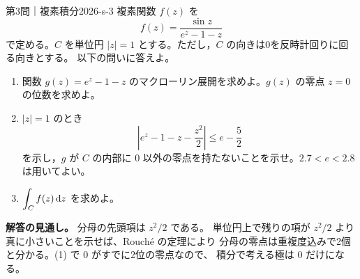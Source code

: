 \begin{problem}{第3問｜複素積分}{2026-s-3}
複素関数 $f(z)$ を
\[
f(z)=\frac{\sin z}{e^z-1-z}
\]
で定める。$C$ を単位円 $|z|=1$ とする。ただし，$C$ の向きは0を反時計回りに回る向きとする。
以下の問いに答えよ。
\begin{enumerate}
  \item[(1)] 関数 $g(z)=e^z-1-z$ のマクローリン展開を求めよ。$g(z)$ の零点 $z=0$ の位数を求めよ。
  \item[(2)] $|z|=1$ のとき
  \[
  \left|e^z-1-z-\frac{z^2}{2}\right|\le e-\frac52
  \]
  を示し，$g$ が $C$ の内部に $0$ 以外の零点を持たないことを示せ。$2.7<e<2.8$ は用いてよい。
  \item[(3)] $\displaystyle\int_C f(z)\,\mathrm{d} z$ を求めよ。
\end{enumerate}
\end{problem}
\begin{memo*}
\textbf{解答の見通し。}
分母の先頭項は $z^2/2$ である。
単位円上で残りの項が $z^2/2$ より真に小さいことを示せば、Rouch\'e の定理により
分母の零点は重複度込みで2個と分かる。(1) で $0$ がすでに2位の零点なので、
積分で考える極は $0$ だけになる。
\end{memo*}
